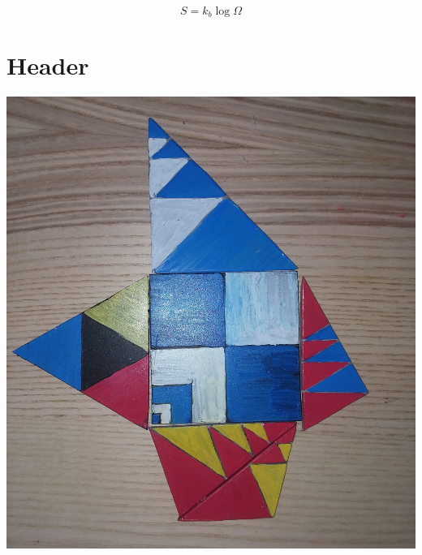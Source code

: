 \documentclass[11pt]{article}
\begin{document}
$$S = k_b\log{\Omega}$$


\section{Header}



\includegraphics[width=\linewidth]{foo_images/image0.jpg}
\end{document}
